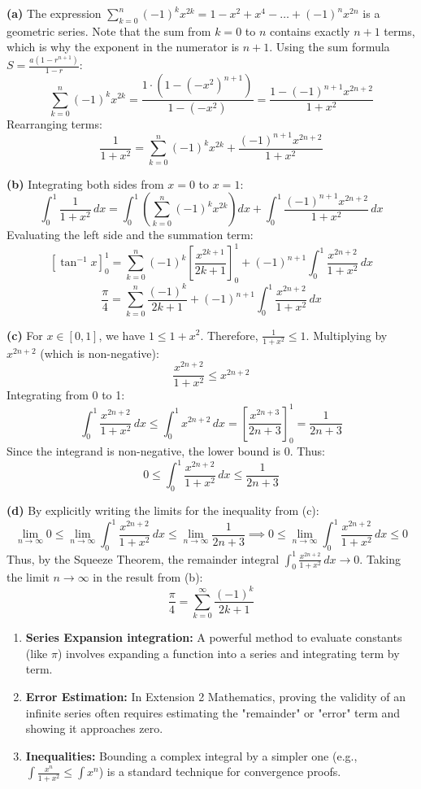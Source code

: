 \begin{solution}

\textbf{(a)} The expression $\sum_{k=0}^{n} (-1)^k x^{2k} = 1 - x^2 + x^4 - \dots + (-1)^n x^{2n}$ is a geometric series.
Note that the sum from $k=0$ to $n$ contains exactly $n+1$ terms, which is why the exponent in the numerator is $n+1$.
Using the sum formula $S = \frac{a(1-r^{n+1})}{1-r}$:
\[
\sum_{k=0}^{n} (-1)^k x^{2k} = \frac{1 \cdot (1 - (-x^2)^{n+1})}{1 - (-x^2)} = \frac{1 - (-1)^{n+1}x^{2n+2}}{1+x^2}
\]
Rearranging terms:
\[
\frac{1}{1+x^2} = \sum_{k=0}^{n} (-1)^k x^{2k} + \frac{(-1)^{n+1}x^{2n+2}}{1+x^2}
\]

\textbf{(b)} Integrating both sides from $x=0$ to $x=1$:
\[
\int_{0}^{1} \frac{1}{1+x^2} \, dx = \int_{0}^{1} \left( \sum_{k=0}^{n} (-1)^k x^{2k} \right) dx + \int_{0}^{1} \frac{(-1)^{n+1}x^{2n+2}}{1+x^2} \, dx
\]
Evaluating the left side and the summation term:
\[
\left[ \tan^{-1}x \right]_0^1 = \sum_{k=0}^{n} (-1)^k \left[ \frac{x^{2k+1}}{2k+1} \right]_0^1 + (-1)^{n+1} \int_{0}^{1} \frac{x^{2n+2}}{1+x^2} \, dx
\]
\[
\frac{\pi}{4} = \sum_{k=0}^{n} \frac{(-1)^k}{2k+1} + (-1)^{n+1} \int_{0}^{1} \frac{x^{2n+2}}{1+x^2} \, dx
\]

\textbf{(c)} For $x \in [0, 1]$, we have $1 \le 1+x^2$. Therefore, $\frac{1}{1+x^2} \le 1$.
Multiplying by $x^{2n+2}$ (which is non-negative):
\[
\frac{x^{2n+2}}{1+x^2} \le x^{2n+2}
\]
Integrating from 0 to 1:
\[
\int_{0}^{1} \frac{x^{2n+2}}{1+x^2} \, dx \le \int_{0}^{1} x^{2n+2} \, dx = \left[ \frac{x^{2n+3}}{2n+3} \right]_0^1 = \frac{1}{2n+3}
\]
Since the integrand is non-negative, the lower bound is 0. Thus:
\[
0 \le \int_{0}^{1} \frac{x^{2n+2}}{1+x^2} \, dx \le \frac{1}{2n+3}
\]

\textbf{(d)} By explicitly writing the limits for the inequality from (c):
\[
\lim_{n \to \infty} 0 \le \lim_{n \to \infty} \int_0^1 \frac{x^{2n+2}}{1+x^2} \, dx \le \lim_{n \to \infty} \frac{1}{2n+3} \implies 0 \le \lim_{n \to \infty} \int_0^1 \frac{x^{2n+2}}{1+x^2} \, dx \le 0
\]
Thus, by the Squeeze Theorem, the remainder integral $\int_{0}^{1} \frac{x^{2n+2}}{1+x^2} \, dx \to 0$.
Taking the limit $n \to \infty$ in the result from (b):
\[
\frac{\pi}{4} = \sum_{k=0}^{\infty} \frac{(-1)^k}{2k+1}
\]

\end{solution}

\begin{takeaways}
\begin{enumerate}
    \item \textbf{Series Expansion integration:} A powerful method to evaluate constants (like $\pi$) involves expanding a function into a series and integrating term by term.
    \item \textbf{Error Estimation:} In Extension 2 Mathematics, proving the validity of an infinite series often requires estimating the "remainder" or "error" term and showing it approaches zero.
    \item \textbf{Inequalities:} Bounding a complex integral by a simpler one (e.g., $\int \frac{x^n}{1+x^2} \le \int x^n$) is a standard technique for convergence proofs.
\end{enumerate}
\end{takeaways}